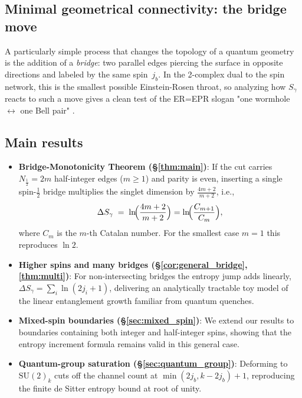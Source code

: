 \documentclass[11pt, a4paper]{article}
\theoremstyle{plain}
\theoremstyle{definition}
\theoremstyle{remark}
\newcommand{\SU}{\mathrm{SU}}
\begin{document}
\subsection{Minimal geometrical connectivity: the bridge move}

A particularly simple process that changes the topology of a quantum geometry is the addition of a \emph{bridge}: two parallel edges piercing the surface in opposite directions and labeled by the same spin~$j_b$. In the 2-complex dual to the spin network, this is the smallest possible Einstein-Rosen throat, so analyzing how $S_{\gamma}$ reacts to such a move gives a clean test of the ER=EPR slogan "one wormhole $\leftrightarrow$ one Bell pair" \cite{MaldacenaSusskind2013}.

\subsection{Main results}

\begin{itemize}\setlength\itemsep{4pt}
\item \textbf{Bridge-Monotonicity Theorem (\S\ref{thm:main})}: 
      If the cut carries $N_{\tfrac12}=2m$ half-integer edges
      ($m\!\ge\!1$) and parity is even, inserting a single
      spin-$\tfrac12$ bridge multiplies the singlet dimension by
      $\tfrac{4m+2}{m+2}$, i.e.,
      \[        \Delta S_{\gamma}          \;=\;\ln\!\Bigl(\frac{4m+2}{m+2}\Bigr)          =\ln\!\Bigl(\frac{C_{m+1}}{C_m}\Bigr),      \]
      where $C_m$ is the $m$-th Catalan number.
      For the smallest case $m=1$ this reproduces $\ln2$.
\item \textbf{Higher spins and many bridges
      (\S\ref{cor:general_bridge}, \ref{thm:multi})}: For
      non-intersecting bridges the entropy jump adds linearly,
      $\Delta S_{\gamma} = \sum_i \ln(2j_i+1)$, delivering an analytically
      tractable toy model of the linear entanglement growth familiar
      from quantum quenches.
\item \textbf{Mixed-spin boundaries (\S\ref{sec:mixed_spin})}: We extend our results to boundaries containing both integer and half-integer spins, showing that the entropy increment formula remains valid in this general case.
\item \textbf{Quantum-group saturation
      (\S\ref{sec:quantum_group})}: Deforming to
      $\SU(2)_k$ cuts off the channel count at
      $\min(2j_b,k-2j_b)+1$, reproducing the finite de Sitter entropy
      bound at root of unity.
\end{itemize}
\end{document}
